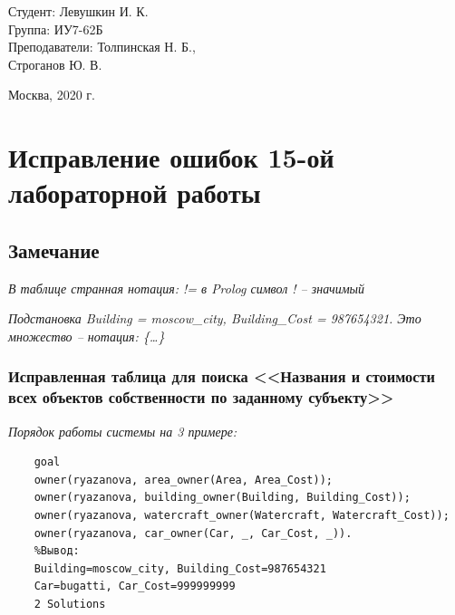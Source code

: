 \documentclass[a4paper,12pt]{article}
\begin{document}
	\vspace*{15mm} 	
	
	\large
	\begin{flushright}
		Студент: Левушкин И. К. \\
		Группа: ИУ7-62Б \\
		Преподаватели: Толпинская Н. Б., \\ Строганов Ю. В. \\
	\end{flushright}
	
	\vspace*{30mm}
	\begin{center}
		Москва, 2020 г.  
	\end{center}
	\thispagestyle{empty}
	
	
	\newpage

	\section*{Исправление ошибок 15-ой лабораторной работы}
	
	\subsection*{Замечание}
	
	\textit{В таблице странная нотация: != в Prolog символ ! – значимый}
	
	\textit{Подстановка Building = moscow\_city, Building\_Cost =
		987654321. Это множество – нотация: \{…\}
}
	
	\subsubsection*{Исправленная таблица для поиска <<Названия и стоимости всех объектов собственности по заданному субъекту>>}
	
	\textit{Порядок работы системы на 3 примере:}
	
	\begin{verbatim}
	goal
	owner(ryazanova, area_owner(Area, Area_Cost));
	owner(ryazanova, building_owner(Building, Building_Cost));
	owner(ryazanova, watercraft_owner(Watercraft, Watercraft_Cost));
	owner(ryazanova, car_owner(Car, _, Car_Cost, _)).
	%Вывод:
	Building=moscow_city, Building_Cost=987654321
	Car=bugatti, Car_Cost=999999999
	2 Solutions
	\end{verbatim}
	
\end{document}
